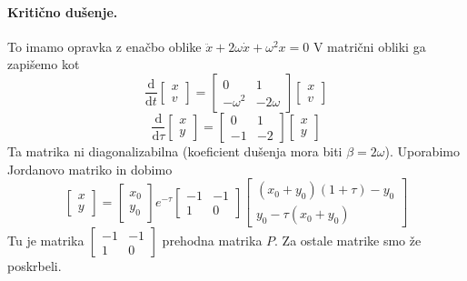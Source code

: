 \documentclass[a4paper]{article}
\newcommand{\dd}[2]{\frac{\mathrm{d} {#1}}{\mathrm{d} {#2}}}
\begin{document}
\paragraph{Kritično dušenje.} To imamo opravka z enačbo oblike $\ddot{x} + 2\omega\dot{x} + \omega^2x = 0$ V matrični obliki ga zapišemo kot
$$\dd{}{t}\begin{bmatrix}
    x \\ v
\end{bmatrix} = \begin{bmatrix}
    0 & 1 \\
    -\omega^2 & -2\omega
\end{bmatrix}\begin{bmatrix}
    x \\ v
\end{bmatrix}$$
$$\dd{}{\tau}\begin{bmatrix}
    x \\ y
\end{bmatrix} = \begin{bmatrix}
    0 & 1 \\
    -1 & -2
\end{bmatrix}\begin{bmatrix}
    x \\ y
\end{bmatrix}$$
Ta matrika ni diagonalizabilna (koeficient dušenja mora biti $\beta = 2\omega$). Uporabimo Jordanovo matriko in dobimo
$$\begin{bmatrix}
    x \\ y
\end{bmatrix} = \begin{bmatrix}
    x_0 \\ y_0
\end{bmatrix} e^{-\tau} \begin{bmatrix}
    -1 & -1 \\
    1 & 0
\end{bmatrix} \begin{bmatrix}
    (x_0 + y_0) (1 + \tau) - y_0 \\
    y_0 - \tau(x_0 + y_0)
\end{bmatrix}$$
Tu je matrika $\displaystyle{\begin{bmatrix}
    -1 & -1 \\
    1 & 0
\end{bmatrix}}$ prehodna matrika $P$. Za ostale matrike smo že poskrbeli.
\end{document}
